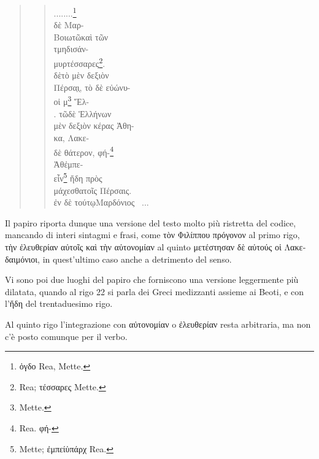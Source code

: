\begin{quotation}
\begin{verse}
{        \textgreek{ ........}\footnote{\textgreek{ ὀγδο} Rea, Mette.}\\ 
        \textgreek{ δὲ Μαρ-}\\
        \textgreek{ Βοιωτῶ καὶ τῶν}\\
        \textgreek{ τ μηδισάν-}\\
        \textgreek{ μυρ τέσσαρες}\footnote{Rea; \textgreek{\rbrk {} τέσσαρες} Mette.}. \\
        \textgreek{ δὲ\rbrk τὸ μὲν δεξιὸν}\\
        \textgreek{ Πέρσ\rbrk\d{α}\d{ι}, τὸ δὲ εὐώνυ-}\\
        \textgreek{ οἱ μ}\footnote{Mette.} \textgreek{Ἕλ-}\\
        \textgreek{. τῶ δὲ Ἑλλήνων}\\
        \textgreek{ μὲν δε\rbrk\d{ξ}ιὸν κέρας Ἀθη-}\\
        \textgreek{ κα, Λακε-}\\
        \textgreek{ δὲ θάτερον, φή-}\footnote{Rea. \textgreek{ φή-}}\\
        \textgreek{ Ἀθ ἐμπε-\rbrk}\\
        \textgreek{\rbrk εἶν}\footnote{Mette; \textgreek{ἐμπεί ὑπάρχ} Rea.} \textgreek{ἤδη πρὸς}\\
        \textgreek{ μάχεσθα τοῖς Πέρσαις.}\\
        \textgreek{ἐν δὲ τούτῳ\rbrk  Μαρδόνιος \lbrk\ ...\rbrk}\\
        }
        \end{verse}
        \end{quotation}
        
        
        
        
        Il papiro riporta dunque una versione del testo molto più ristretta del codice, mancando di
        interi sintagmi e frasi, come \textgreek{τὸν Φιλίππου πρόγονον} al primo
        rigo, \textgreek{τὴν ἐλευθερίαν αὐτοῖς καὶ τὴν αὐτονομίαν} al quinto
        \textgreek{μετέστησαν δὲ αὐτούς οἱ Λακεδαιμόνιοι}, in
        quest'ultimo caso anche a detrimento del senso.
        
        
        Vi sono poi due luoghi del papiro che forniscono una versione leggermente più
        dilatata, quando al rigo 22 si parla dei {\textquotedbl}Greci
        medizzanti{\textquotedbl} assieme ai Beoti, e con
        l'\textgreek{ἤδη} del trentaduesimo rigo.
        
        
        Al quinto rigo l'integrazione con \textgreek{αὐτονομίαν} o
        \textgreek{ἐλευθερίαν} resta arbitraria, ma non c'è posto comunque
        per il verbo. 
        
